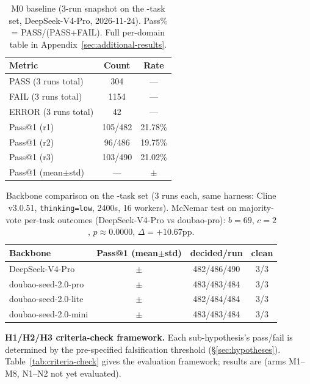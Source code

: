 \begin{table}[ht]
\centering
\caption{M0 baseline (3-run snapshot on the \Ncases{}-task set, DeepSeek-V4-Pro, 2026-11-24). Pass\% = PASS/(PASS+FAIL). Full per-domain table in Appendix~\ref{sec:additional-results}.}
\label{tab:m0-baseline}
\scriptsize
\setlength{\tabcolsep}{4pt}
\begin{tabular}{@{}lcc@{}}
\toprule
\textbf{Metric} & \textbf{Count} & \textbf{Rate} \\
\midrule
PASS (3 runs total) & 304 & --- \\
FAIL (3 runs total) & 1154 & --- \\
ERROR (3 runs total) & 42 & --- \\
\midrule
Pass@1 (r1) & 105/482 & 21.78\% \\
Pass@1 (r2) & 96/486 & 19.75\% \\
Pass@1 (r3) & 103/490 & 21.02\% \\
Pass@1 (mean$\pm$std) & --- & \textbf{\MzeroPass{}$\pm$\MzeroStd{}} \\
\bottomrule
\end{tabular}
\end{table}

\begin{table}[ht]
\centering
\caption{Backbone comparison on the \Ncases{}-task set (3 runs each, same harness: Cline v3.0.51, \texttt{thinking=low}, 2400s, 16 workers). McNemar test on majority-vote per-task outcomes (DeepSeek-V4-Pro vs doubao-pro): $b=69$, $c=2$, $p\approx 0.0000$, $\Delta{=}+10.67$pp.}
\label{tab:model-comparison}
\scriptsize
\setlength{\tabcolsep}{4pt}
\begin{tabular}{@{}lccc@{}}
\toprule
\textbf{Backbone} & \textbf{Pass@1 (mean$\pm$std)} & \textbf{decided/run} & \textbf{clean} \\
\midrule
DeepSeek-V4-Pro & \textbf{\DSvPro{}$\pm$\DSvProStd{}} & 482/486/490 & 3/3 \\
doubao-seed-2.0-pro & \DoubaoPro{}$\pm$\DoubaoProStd{} & 483/483/484 & 3/3 \\
doubao-seed-2.0-lite & \DoubaoLite{}$\pm$\DoubaoLiteStd{} & 482/484/484 & 3/3 \\
doubao-seed-2.0-mini & \DoubaoMini{}$\pm$\DoubaoMiniStd{} & 483/483/484 & 3/3 \\
\bottomrule
\end{tabular}
\end{table}

\textbf{H1/H2/H3 criteria-check framework.} Each sub-hypothesis's pass/fail is determined by the pre-specified falsification threshold (\S\ref{sec:hypotheses}). Table~\ref{tab:criteria-check} gives the evaluation framework; results are \TBD{} (arms M1--M8, N1--N2 not yet evaluated).

